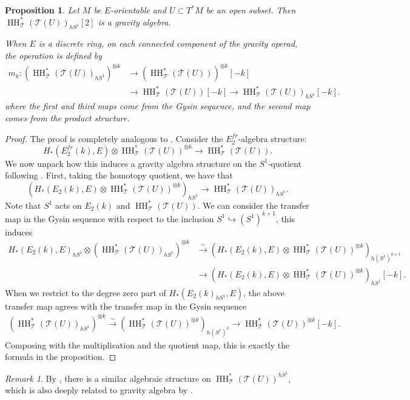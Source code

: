 \documentclass[11pt]{amsart}
\numberwithin{equation}{section}
\theoremstyle{plain}
\newtheorem{Prop}[prop]{Proposition}
\theoremstyle{definition}
\theoremstyle{remark}
\newtheorem{RMK}[rmk]{Remark}
\newcommand{\sT} { {\mathscr{T}}}
\newcommand\HH{\operatorname{HH}}
\begin{document}
\begin{Prop}
Let $M$ be $E$-orientable and $U \subset T^*M$ be an open subset. Then $\HH^*_\sT(\sT(U))_{hS^1}[2]$ is a gravity algebra.

When $E$ is a discrete ring, on each connected component of the gravity operad, the operation is defined by
\begin{align*}
m_k: (\HH^*_\sT(\sT(U))_{hS^1})^{\otimes k} &\to (\HH^*_\sT(\sT(U)))^{\otimes k}[-k] \\
&\to \HH^*_\sT(\sT(U))[-k] \to \HH^*_\sT(\sT(U))_{hS^1}[-k].
\end{align*}
where the first and third maps come from the Gysin sequence, and the second map comes from the product structure.
\end{Prop}
\begin{proof}
The proof is completely analogous to \cite[Section 7.4]{Westerland-Equiv-Operad}. Consider the $E_2^\textit{fr}$-algebra structure:
\[H_*(E_2^\textit{fr}(k), E) \otimes \HH^*_\sT(\sT(U))^{\otimes k} \to \HH^*_\sT(\sT(U)).\]
We now unpack how this induces a gravity algebra structure on the $S^1$-quotient following \cite[Section 7.2]{Westerland-Equiv-Operad}. First, taking the homotopy quotient, we have that
\[(H_*(E_2(k), E) \otimes \HH^*_\sT(\sT(U))^{\otimes k})_{hS^1} \to \HH^*_\sT(\sT(U))_{hS^1}.\]
Note that $S^1$ acts on $E_2(k)$ and $\HH^*_\sT(\sT(U))$. We can consider the transfer map in the Gysin sequence with respect to the inclusion $S^1 \hookrightarrow (S^1)^{k+1}$, this induces
\begin{align*}
H_*(E_2(k), E)_{hS^1} \otimes (\HH^*_\sT(\sT(U))_{hS^1})^{\otimes k} &\xrightarrow{\sim} (H_*(E_2(k), E) \otimes \HH^*_\sT(\sT(U))^{\otimes k})_{h(S^1)^{k+1}} \\
&\to (H_*(E_2(k), E) \otimes \HH^*_\sT(\sT(U))^{\otimes k})_{hS^1}[-k].
\end{align*}
When we restrict to the degree zero part of $H_*(E_2(k)_{hS^1}, E)$, the above transfer map agrees with the transfer map in the Gysin sequence
\begin{align*}
(\HH^*_\sT(\sT(U))_{hS^1})^{\otimes k} \xrightarrow{\sim}(\HH^*_\sT(\sT(U))^{\otimes k})_{h(S^1)^k} \to \HH^*_\sT(\sT(U))^{\otimes k}[-k].
\end{align*}
Composing with the multiplication and the quotient map, this is exactly the formula in the proposition.
\end{proof}

\begin{RMK}By \cite[Corollary 2.4]{Westerland-Equiv-Operad}, there is a similar algebraic structure on $\HH^*_\sT(\sT(U))^{hS^1}$, which is also deeply related to gravity algebra by \cite[Corollary 2.8]{Westerland-Equiv-Operad}.
\end{RMK}
\end{document}

